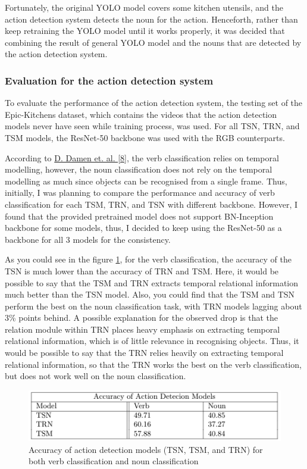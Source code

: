 \documentclass{article}
\begin{document}
Fortunately, the original YOLO model covers some kitchen utensils, and the action detection system detects the noun for the action. Henceforth, rather than keep retraining the YOLO model until it works properly, it was decided that combining the result of general YOLO model and the nouns that are detected by the action detection system.

\subsubsection{Evaluation for the action detection system}

To evaluate the performance of the action detection system, the testing set of the Epic-Kitchens dataset, which contains the videos that the action detection models never have seen while training process, was used. For all TSN, TRN, and TSM models, the ResNet-50 backbone was used with the RGB counterparts.

According to \hyperlink{ref8}{D. Damen et. al. [8]}, the verb classification relies on temporal modelling, however, the noun classification does not rely on the temporal modelling as much since objects can be recognised from a single frame. Thus, initially, I was planning to compare the performance and accuracy of verb classification for each TSM, TRN, and TSN with different backbone. However, I found that the provided pretrained model does not support BN-Inception backbone for some models, thus, I decided to keep using the ResNet-50 as a backbone for all 3 models for the consistency.

As you could see in the figure \ref{fig:chartForEvalActionDetection}, for the verb classification, the accuracy of the TSN is much lower than the accuracy of TRN and TSM. Here, it would be possible to say that the TSM and TRN extracts temporal relational information much better than the TSN model. Also, you could find that the TSM and TSN perform the best on the noun classification task, with TRN models lagging about 3\% points behind. A possible explanation for the observed drop is that the relation module within TRN places heavy emphasis on extracting temporal relational information, which is of little relevance in recognising objects. Thus, it would be possible to say that the TRN relies heavily on extracting temporal relational information, so that the TRN works the best on the verb classification, but does not work well on the noun classification.

\begin{figure}[H]
    \centering
    \includegraphics[scale=0.5]{imgs/action_detection_accuracy.png}
    \caption{Accuracy of action detection models (TSN, TSM, and TRN) for both verb classification and noun classification}
    \label{fig:chartForEvalActionDetection}
\end{figure}
\end{document}
